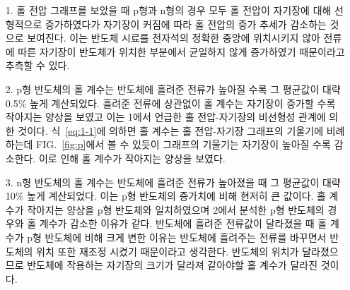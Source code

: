 \documentclass[aps,reprint,superscriptaddress,10pt]{revtex4-2}
\begin{document}
\begin{itemize}
  \item[1. ] 홀 전압 그래프를 보았을 때 p형과 n형의 경우 모두 홀 전압이 자기장에 대해
  선형적으로 증가하였다가 자기장이 커짐에 따라 홀 전압의 증가 추세가 감소하는 것으로
  보여진다. 이는 반도체 시료를 전자석의 정확한 중앙에 위치시키지 않아 전류에 따른
  자기장이 반도체가 위치한 부분에서 균일하지 않게 증가하였기 때문이라고
  추측할 수 있다.
  \item[2. ] p형 반도체의 홀 계수는 반도체에 흘려준 전류가 높아질 수록 그 평균값이 대략
  0.5\% 높게 계산되었다. 흘려준 전류에 상관없이 홀 계수는 자기장이 증가할 수록 작아지는
  양상을 보였고 이는 1에서 언급한 홀 전압-자기장의 비선형성 관계에 의한 것이다.
  식~\eqref{eq:1-1}에 의하면 홀 계수는 홀 전압-자기장 그래프의 기울기에 비례하는데
  FIG.~\ref{fig:p}에서 볼 수 있듯이 그래프의 기울기는 자기장이 높아질 수록 감소한다.
  이로 인해 홀 계수가 작아지는 양상을 보였다.
  \item[3. ] n형 반도체의 홀 계수는 반도체에 흘려준 전류가 높아졌을 때 그 평균값이 대략
  10\% 높게 계산되었다. 이는 p형 반도체의 증가치에 비해 현저히 큰 값이다. 홀 계수가 
  작아지는 양상을 p형 반도체와 일치하였으며 2에서 분석한 p형 반도체의 경우와 홀 계수가
  감소한 이유가 같다. 반도체에 흘려준 전류값이 달라졌을 때 홀 계수가 p형 반도체에 비해 
  크게 변한 이유는 반도체에 흘려주는 전류를 바꾸면서 반도체의 위치 또한 재조정 시켰기
  때문이라고 생각한다. 반도체의 위치가 달라졌으므로 반도체에 작용하는 자기장의 크기가
  달라져 같아야할 홀 계수가 달라진 것이다.
\end{itemize}



% 




\vfill
\end{document}

